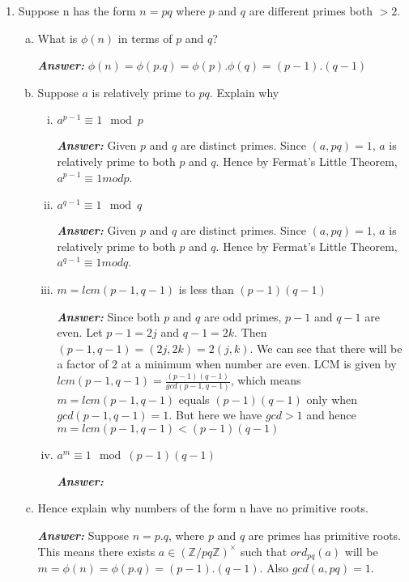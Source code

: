 \documentclass[11pt,a4paper,fleqn]{article}
\begin{document}
\begin{enumerate}[1.]
		\item Suppose n has the form $n = pq$ where $p$ and $q$ are different primes both $> 2$. \\
	
		\begin{enumerate}[(a)]
			\item What is $\phi(n)$ in terms of $p$ and $q$?
			\begin{flushleft}
				\textbf{\textit{Answer:}} $\phi(n) = \phi(p.q) = \phi(p).\phi(q) = (p-1).(q-1)$
			\end{flushleft}
			\item Suppose $a$ is relatively prime to $pq$.  Explain why 
			\begin{enumerate}[i.]
				\item $a^{p-1} \equiv 1\mod p$
				\begin{flushleft}
					\textbf{\textit{Answer:}} Given $p$ and $q$ are distinct primes. Since $(a, pq) = 1$, $a$ is relatively prime to both $p$ and $q$. Hence by Fermat's Little Theorem, $a^{p-1} \equiv 1 mod p$.
				\end{flushleft}
				\item $a^{q-1} \equiv 1\mod q$
				\begin{flushleft}
					\textbf{\textit{Answer:}} Given $p$ and $q$ are distinct primes. Since $(a, pq) = 1$, $a$ is relatively prime to both $p$ and $q$. Hence by Fermat's Little Theorem, $a^{q-1} \equiv 1 mod q$.
				\end{flushleft}
				\item \label{item:Q3biii} $m = lcm(p-1, q-1)$ is less than $(p-1)(q-1)$ 
				\begin{flushleft}
					\textbf{\textit{Answer:}} Since both $p$ and $q$ are odd primes, $p-1$ and $q-1$ are even. Let $p - 1 = 2j$ and $q - 1 = 2k$. Then $(p-1, q-1) = (2j, 2k) = 2(j, k)$. We can see that there will be a factor of $2$ at a minimum when number are even. LCM is given by $lcm(p - 1, q - 1) = \frac{(p-1)(q-1)}{gcd(p-1, q-1)}$, which means $m = lcm(p-1, q-1)$ equals $(p-1)(q-1)$ only when $gcd(p-1, q-1) = 1$. But here we have $gcd > 1$ and hence $m = lcm(p-1, q-1) < (p-1)(q-1)$
				\end{flushleft}
				\item $a^m \equiv 1 \mod (p-1)(q-1)$
				\begin{flushleft}
					\textbf{\textit{Answer:}}
				\end{flushleft}
			\end{enumerate}
			\item Hence explain why numbers of the form n have no primitive roots.
			\begin{flushleft}
				\textbf{\textit{Answer:}} Suppose $n = p.q$, where $p$ and $q$ are primes has primitive roots. This means there exists $a \in (\mathbb{Z}/pq\mathbb{Z})^\times$ such that $ord_{pq}(a)$ will be $m = \phi(n) = \phi(p.q) = (p - 1).(q - 1)$. Also $gcd(a, pq) = 1$.
				\bigbreak
				

\end{flushleft}
\end{enumerate}
\end{enumerate}
\end{document}
